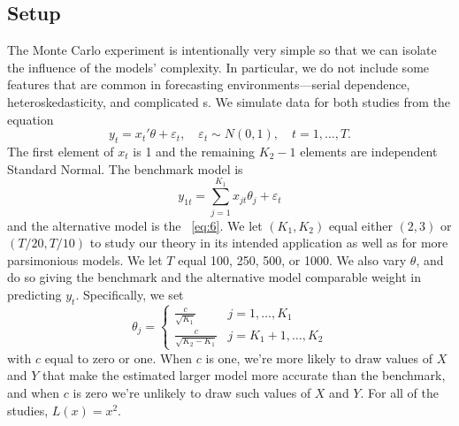 \documentclass[11pt]{article}
\newcommand{\e}{\varepsilon}
\begin{document}
\subsection{Setup}\label{sec:simulation-design}
The Monte Carlo experiment is intentionally very simple so that we can
isolate the influence of the models' complexity.  In particular, we do
not include some features that are common in forecasting
environments---serial dependence, heteroskedasticity, and complicated
\dgp s.  We simulate data for both studies from the equation
\begin{equation}\label{eq:6}
  y_t = x_t'\theta + \e_t,\quad \e_t \sim N(0,1),
  \quad t=1,\dots,T.
\end{equation}
The first element of $x_t$ is 1 and the remaining $K_2-1$ elements are
independent Standard Normal.  The benchmark model is
\begin{equation}
  \label{eq:1}
  y_{1t} = \sum_{j=1}^{K_1} x_{jt}\theta_j + \e_t
\end{equation}
and the alternative model is the \dgp\ \eqref{eq:6}.  We let
$(K_1,K_2)$ equal either $(2,3)$ or $(T/20,T/10)$ to study our theory
in its intended application as well as for more parsimonious models.
We let $T$ equal 100, 250, 500, or 1000.  We also vary $\theta$, and do 
so giving the benchmark and the alternative model comparable weight in
predicting $y_t$.  Specifically, we set
\begin{equation*}
  \theta_j = 
\begin{cases} \frac{c}{\sqrt{K_1}} & j = 1,\dots,K_1 \\
\frac{c}{\sqrt{K_2 - K_1}} & j = K_1 + 1,\dots,K_2 \end{cases}  
\end{equation*}
with $c$ equal to zero or one.  When $c$ is one, we're more likely to
draw values of $X$ and $Y$ that make the estimated larger model more
accurate than the benchmark, and when $c$ is zero we're unlikely to
draw such values of $X$ and $Y$.  For all of the studies, $L(x) =
x^2$.
\end{document}
